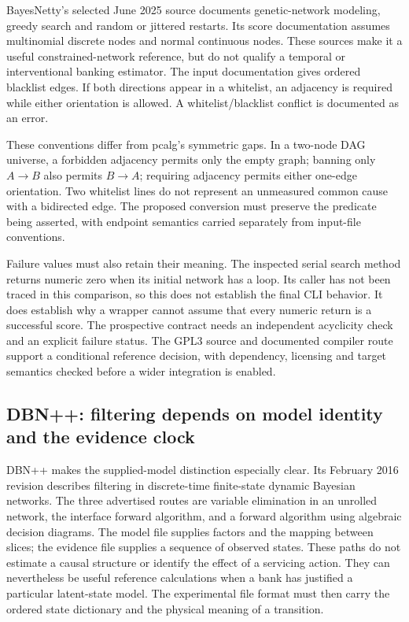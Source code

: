 BayesNetty's selected June 2025 source documents genetic-network modeling,
greedy search and random or jittered restarts. Its score documentation assumes
multinomial discrete nodes and normal continuous nodes. These sources make it
a useful constrained-network reference, but do not qualify a temporal or
interventional banking estimator. The input documentation gives ordered
blacklist edges. If both directions appear in a whitelist, an adjacency is
required while either orientation is allowed. A whitelist/blacklist conflict
is documented as an error. \citep{exec16_ct_bayesnetty}

These conventions differ from pcalg's symmetric gaps. In a two-node DAG
universe, a forbidden adjacency permits only the empty graph; banning only
$A\to B$ also permits $B\to A$; requiring adjacency permits either one-edge
orientation. Two whitelist lines do not represent an unmeasured common cause
with a bidirected edge. The proposed conversion must preserve the predicate
being asserted, with endpoint semantics carried separately from input-file
conventions. \citep{exec16_ct_bayesnetty,exec16_ct_pcalg,exec16_ct_oracle}

Failure values must also retain their meaning. The inspected serial search
method returns numeric zero when its initial network has a loop. Its caller
has not been traced in this comparison, so this does not establish the final
CLI behavior. It does establish why a wrapper cannot assume that every numeric
return is a successful score. The prospective contract needs an independent
acyclicity check and an explicit failure status. The GPL3 source and documented
compiler route support a conditional reference decision, with dependency,
licensing and target semantics checked before a wider integration is enabled.
\citep{exec16_ct_bayesnetty,exec16_ct_design}

\subsection{DBN++: filtering depends on model identity and the evidence clock}
\label{rel19:dbnpp}

DBN++ makes the supplied-model distinction especially clear. Its February
2016 revision describes filtering in discrete-time finite-state dynamic
Bayesian networks. The three advertised routes are variable elimination in
an unrolled network, the interface forward algorithm, and a forward algorithm
using algebraic decision diagrams. The model file supplies factors and the
mapping between slices; the evidence file supplies a sequence of observed
states. These paths do not estimate a causal structure or identify the effect
of a servicing action. They can nevertheless be useful reference calculations
when a bank has justified a particular latent-state model. The experimental
file format must then carry the ordered state dictionary and the physical
meaning of a transition. \citep{rel19dbnpp}

